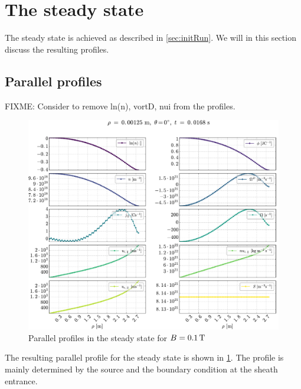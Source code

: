\section{The steady state}
%
The steady state is achieved as described in \cref{sec:initRun}.
We will in this section discuss the resulting profiles.

\subsection{Parallel profiles}

FIXME: Consider to remove ln(n), vortD, nui from the profiles.

%
\begin{figure}[htb]
    \centering
    \includegraphics[width=1.0\textwidth]{fig/results/1DProfiles/B010Par}
    \caption{Parallel profiles in the steady state for $B=0.1\, \text{T}$}
    \label{fig:parProfs}
\end{figure}
%
The resulting parallel profile for the steady state is shown in \cref{fig:parProfs}.
The profile is mainly determined by the source and the boundary condition at the sheath entrance.

